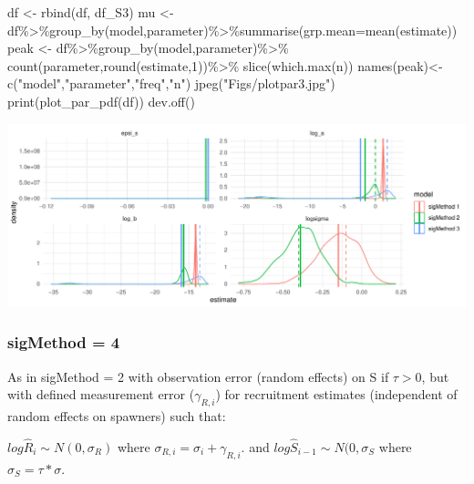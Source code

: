 \documentclass[
]{article}
\newenvironment{Shaded}{\begin{snugshade}}{\end{snugshade}}
\newcommand{\AttributeTok}[1]{\textcolor[rgb]{0.77,0.63,0.00}{#1}}
\newcommand{\DecValTok}[1]{\textcolor[rgb]{0.00,0.00,0.81}{#1}}
\newcommand{\FunctionTok}[1]{\textcolor[rgb]{0.00,0.00,0.00}{#1}}
\newcommand{\NormalTok}[1]{#1}
\newcommand{\OtherTok}[1]{\textcolor[rgb]{0.56,0.35,0.01}{#1}}
\newcommand{\SpecialCharTok}[1]{\textcolor[rgb]{0.00,0.00,0.00}{#1}}
\newcommand{\StringTok}[1]{\textcolor[rgb]{0.31,0.60,0.02}{#1}}
\begin{document}
\begin{Shaded}
\begin{Highlighting}[]
\NormalTok{  df }\OtherTok{\textless{}{-}} \FunctionTok{rbind}\NormalTok{(df, df\_S3)}
\NormalTok{  mu   }\OtherTok{\textless{}{-}}\NormalTok{ df}\SpecialCharTok{\%\textgreater{}\%}\FunctionTok{group\_by}\NormalTok{(model,parameter)}\SpecialCharTok{\%\textgreater{}\%}\FunctionTok{summarise}\NormalTok{(}\AttributeTok{grp.mean=}\FunctionTok{mean}\NormalTok{(estimate))}
\NormalTok{  peak }\OtherTok{\textless{}{-}}\NormalTok{ df}\SpecialCharTok{\%\textgreater{}\%}\FunctionTok{group\_by}\NormalTok{(model,parameter)}\SpecialCharTok{\%\textgreater{}\%}
    \FunctionTok{count}\NormalTok{(parameter,}\FunctionTok{round}\NormalTok{(estimate,}\DecValTok{1}\NormalTok{))}\SpecialCharTok{\%\textgreater{}\%}
    \FunctionTok{slice}\NormalTok{(}\FunctionTok{which.max}\NormalTok{(n))}
  \FunctionTok{names}\NormalTok{(peak)}\OtherTok{\textless{}{-}} \FunctionTok{c}\NormalTok{(}\StringTok{"model"}\NormalTok{,}\StringTok{"parameter"}\NormalTok{,}\StringTok{"freq"}\NormalTok{,}\StringTok{"n"}\NormalTok{)}
  \FunctionTok{jpeg}\NormalTok{(}\StringTok{"Figs/plotpar3.jpg"}\NormalTok{)}
  \FunctionTok{print}\NormalTok{(}\FunctionTok{plot\_par\_pdf}\NormalTok{(df))}
  \FunctionTok{dev.off}\NormalTok{()}
\end{Highlighting}
\end{Shaded}

\includegraphics{futR_demo_files/figure-latex/plot3-1.pdf}

\hypertarget{sigmethod-4-1}{%
\subsubsection{sigMethod = 4}\label{sigmethod-4-1}}

As in sigMethod = 2 with observation error (random effects) on S if
\(\tau >0\), but with defined measurement error (\(\gamma_{R,i}\)) for
recruitment estimates (independent of random effects on spawners) such
that:

\(log\hat{R}_i\sim N(0,\sigma_R)\) where
\(\sigma_{R,i}=\sigma_i+\gamma_{R,i}\). and
\(log\hat{S}_{i-1} \sim N(0,\sigma_S\) where \(\sigma_S=\tau*\sigma\).
\end{document}
